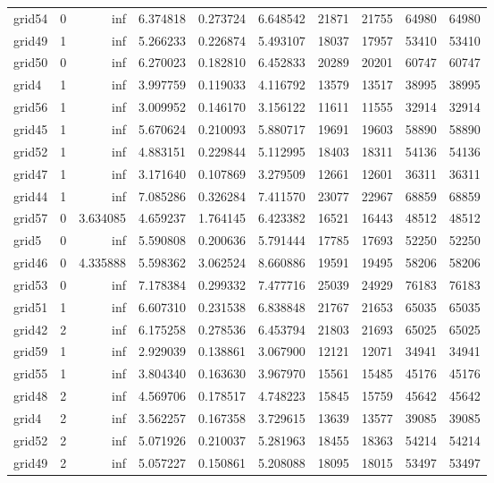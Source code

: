 \begin{longtable}{|l|r|r|r|r|r|r|r|r|r|}
grid54 & 0 & inf & 6.374818 & 0.273724 & 6.648542 & 21871 & 21755 & 64980 & 64980 \\
grid49 & 1 & inf & 5.266233 & 0.226874 & 5.493107 & 18037 & 17957 & 53410 & 53410 \\
grid50 & 0 & inf & 6.270023 & 0.182810 & 6.452833 & 20289 & 20201 & 60747 & 60747 \\
grid4 & 1 & inf & 3.997759 & 0.119033 & 4.116792 & 13579 & 13517 & 38995 & 38995 \\
grid56 & 1 & inf & 3.009952 & 0.146170 & 3.156122 & 11611 & 11555 & 32914 & 32914 \\
grid45 & 1 & inf & 5.670624 & 0.210093 & 5.880717 & 19691 & 19603 & 58890 & 58890 \\
grid52 & 1 & inf & 4.883151 & 0.229844 & 5.112995 & 18403 & 18311 & 54136 & 54136 \\
grid47 & 1 & inf & 3.171640 & 0.107869 & 3.279509 & 12661 & 12601 & 36311 & 36311 \\
grid44 & 1 & inf & 7.085286 & 0.326284 & 7.411570 & 23077 & 22967 & 68859 & 68859 \\
grid57 & 0 & 3.634085 & 4.659237 & 1.764145 & 6.423382 & 16521 & 16443 & 48512 & 48512 \\
grid5 & 0 & inf & 5.590808 & 0.200636 & 5.791444 & 17785 & 17693 & 52250 & 52250 \\
grid46 & 0 & 4.335888 & 5.598362 & 3.062524 & 8.660886 & 19591 & 19495 & 58206 & 58206 \\
grid53 & 0 & inf & 7.178384 & 0.299332 & 7.477716 & 25039 & 24929 & 76183 & 76183 \\
grid51 & 1 & inf & 6.607310 & 0.231538 & 6.838848 & 21767 & 21653 & 65035 & 65035 \\
grid42 & 2 & inf & 6.175258 & 0.278536 & 6.453794 & 21803 & 21693 & 65025 & 65025 \\
grid59 & 1 & inf & 2.929039 & 0.138861 & 3.067900 & 12121 & 12071 & 34941 & 34941 \\
grid55 & 1 & inf & 3.804340 & 0.163630 & 3.967970 & 15561 & 15485 & 45176 & 45176 \\
grid48 & 2 & inf & 4.569706 & 0.178517 & 4.748223 & 15845 & 15759 & 45642 & 45642 \\
grid4 & 2 & inf & 3.562257 & 0.167358 & 3.729615 & 13639 & 13577 & 39085 & 39085 \\
grid52 & 2 & inf & 5.071926 & 0.210037 & 5.281963 & 18455 & 18363 & 54214 & 54214 \\
grid49 & 2 & inf & 5.057227 & 0.150861 & 5.208088 & 18095 & 18015 & 53497 & 53497 \\

\end{longtable}
